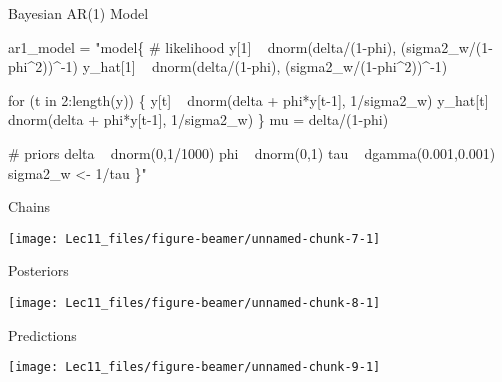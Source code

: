 \documentclass[11pt,ignorenonframetext,]{beamer}
\newenvironment{Shaded}{}{}
\newcommand{\NormalTok}[1]{#1}
\newcommand{\StringTok}[1]{\textcolor[rgb]{0.25,0.44,0.63}{#1}}
\let\oldShaded\Shaded
\let\endoldShaded\endShaded
\renewenvironment{Shaded}{\footnotesize\begin{spacing}{0.9}\oldShaded}{\endoldShaded\end{spacing}}
\begin{document}
\begin{frame}[fragile,t]{Bayesian AR(1) Model}
\protect\hypertarget{bayesian-ar1-model}{}

\begin{Shaded}
\begin{Highlighting}[]
\NormalTok{ar1_model =}\StringTok{ "model\{}
\StringTok{# likelihood}
\StringTok{  y[1] ~ dnorm(delta/(1-phi), (sigma2_w/(1-phi^2))^-1)}
\StringTok{  y_hat[1] ~ dnorm(delta/(1-phi), (sigma2_w/(1-phi^2))^-1)}

\StringTok{  for (t in 2:length(y)) \{}
\StringTok{    y[t] ~ dnorm(delta + phi*y[t-1], 1/sigma2_w)}
\StringTok{    y_hat[t] ~ dnorm(delta + phi*y[t-1], 1/sigma2_w)}
\StringTok{  \}}
\StringTok{  }
\StringTok{  mu = delta/(1-phi)}

\StringTok{# priors}
\StringTok{  delta ~ dnorm(0,1/1000)}
\StringTok{  phi ~ dnorm(0,1)}
\StringTok{  tau ~ dgamma(0.001,0.001)}
\StringTok{  sigma2_w <- 1/tau}
\StringTok{\}"}
\end{Highlighting}
\end{Shaded}

\end{frame}

\begin{frame}{Chains}
\protect\hypertarget{chains}{}

\begin{center}\texttt{[image: Lec11\_files/figure-beamer/unnamed-chunk-7-1]} \end{center}

\end{frame}

\begin{frame}{Posteriors}
\protect\hypertarget{posteriors}{}

\begin{center}\texttt{[image: Lec11\_files/figure-beamer/unnamed-chunk-8-1]} \end{center}

\end{frame}

\begin{frame}{Predictions}
\protect\hypertarget{predictions}{}

\begin{center}\texttt{[image: Lec11\_files/figure-beamer/unnamed-chunk-9-1]} \end{center}

\end{frame}
\end{document}

